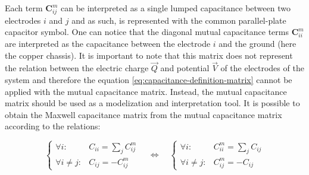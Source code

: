 Each term $\bm{C}_{ij}^m$ can be interpreted as a single lumped capacitance between two electrodes $i$ and $j$ and as such, is represented with the common parallel-plate capacitor symbol. One can notice that the diagonal mutual capacitance terms $\bm{C}_{ii}^m$ are interpreted as the capacitance between the electrode $i$ and the ground (here the copper chassis). It is important to note that this matrix does not represent the relation between the electric charge $\vec{Q}$ and potential $\vec{V}$ of the electrodes of the system and therefore the equation \ref{eq:capacitance-definition-matrix} cannot be applied with the mutual capacitance matrix. Instead, the mutual capacitance matrix should be used as a modelization and interpretation tool. It is possible to obtain the Maxwell capacitance matrix from the mutual capacitance matrix according to the relations:


\begin{equation} 
\label{eq:mutual-to-maxwell}
\left\lbrace
\begin{array}{lc}
\forall i :& C_{ii} = \sum_j C_{ij}^m \\
\forall i \neq j:&  C_{ij} = - C_{ij}^m
\end{array}
\right.
\quad \Leftrightarrow \quad
\left\lbrace
\begin{array}{lc}
\forall i :& C_{ii}^m = \sum_j C_{ij} \\
\forall i \neq j:&  C_{ij}^m = - C_{ij}
\end{array}
\right.
\end{equation}

